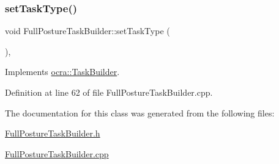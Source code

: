 \subsubsection{\texorpdfstring{set\+Task\+Type()}{setTaskType()}}
{\footnotesize\ttfamily void Full\+Posture\+Task\+Builder\+::set\+Task\+Type (\begin{DoxyParamCaption}{ }\end{DoxyParamCaption})\hspace{0.3cm}{\ttfamily [protected]}, {\ttfamily [virtual]}}



Implements \hyperlink{classocra_1_1TaskBuilder_a1a979fc495be6dc30483aa8fd0ff2650}{ocra\+::\+Task\+Builder}.



Definition at line 62 of file Full\+Posture\+Task\+Builder.\+cpp.



The documentation for this class was generated from the following files\+:\begin{DoxyCompactItemize}
\item 
\hyperlink{FullPostureTaskBuilder_8h}{Full\+Posture\+Task\+Builder.\+h}\item 
\hyperlink{FullPostureTaskBuilder_8cpp}{Full\+Posture\+Task\+Builder.\+cpp}\end{DoxyCompactItemize}
